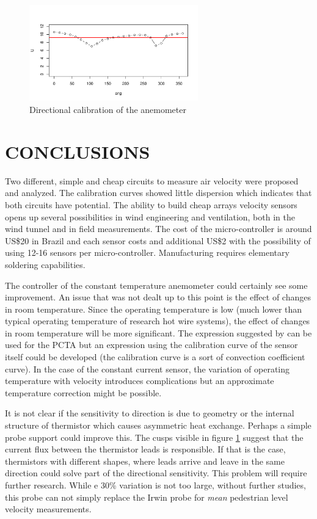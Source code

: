 \documentclass[10pt,fleqn,a4paper,twoside]{article}
\begin{document}
\begin{figure}[h!]
\centering
\includegraphics[width=0.65\textwidth]{../../figures/dircal.pdf}
\caption{Directional calibration of the anemometer}
\label{fig:calibr-dir}
\end{figure}

\section{CONCLUSIONS}
Two different, simple and cheap circuits to measure air velocity were proposed and analyzed. The calibration curves showed little dispersion which indicates that both circuits have potential. The ability to build cheap arrays velocity sensors opens up several possibilities in wind engineering and ventilation, both in the wind tunnel and in field measurements. The cost of the micro-controller is around US\$20 in Brazil and each sensor costs and additional US\$2 with the possibility of using 12-16 sensors per micro-controller. Manufacturing requires elementary soldering capabilities. 

The controller of the constant temperature anemometer could certainly see some improvement. An issue that was not dealt up to this point is the effect of changes in room temperature. Since the operating temperature is low (much lower than typical operating temperature of research hot wire systems), the effect of changes in room temperature will be more significant. The expression suggested by \citet{Jorgensen02} can be used for the PCTA but an expression using the calibration curve of the sensor itself could be developed (the calibration curve is a sort of convection coefficient curve). In the case of the constant current sensor, the variation of operating temperature with velocity introduces complications but an approximate temperature correction might be possible.

It is not clear if the sensitivity to direction is due to geometry or the internal structure of thermistor which causes asymmetric heat exchange. Perhaps a simple probe support could improve this. The cusps visible in figure \ref{fig:calibr-dir} suggest that the current flux between the thermistor leads is responsible. If that is the case, thermistors with different shapes, where leads arrive and leave in the same direction could solve part of the directional sensitivity. This problem will require further research. While e 30\% variation is not too large, without further studies, this probe can not simply replace the Irwin probe \citep{Irwin81} for \emph{mean} pedestrian level velocity measurements. 
\end{document}
